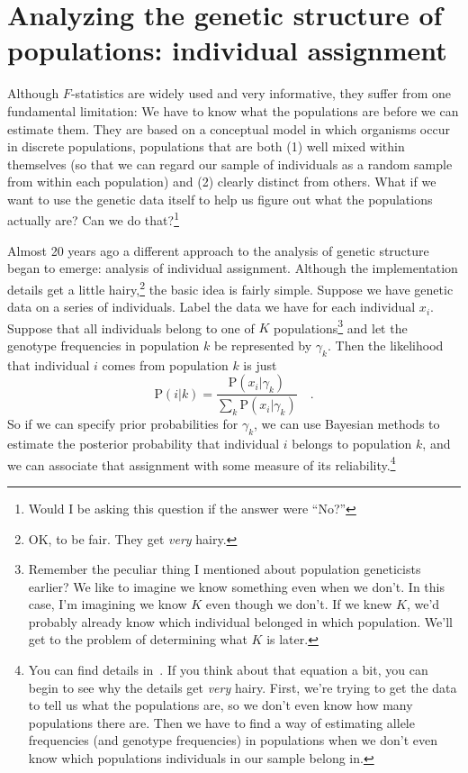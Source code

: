 \chapter{Analyzing the genetic structure of populations: individual assignment}

Although $F$-statistics are widely used and very informative, they
suffer from one fundamental limitation: We have to know what the
populations are before we can estimate them. They are based on a
conceptual model in which organisms occur in discrete populations,
populations that are both (1) well mixed within themselves (so that we
can regard our sample of individuals as a random sample from within
each population) and (2) clearly distinct from others. What if we want
to use the genetic data itself to help us figure out what the
populations actually are? Can we do that?\footnote{Would I be asking
  this question if the answer were ``No?''}

Almost 20 years ago a different approach to the analysis of genetic
structure began to emerge: analysis of individual
assignment. Although the implementation
details get a little hairy,\footnote{OK, to be fair. They get {\it
    very\/} hairy.} the basic idea is fairly simple. Suppose we have
genetic data on a series of individuals. Label the data we have for
each individual $x_i$. Suppose that all individuals belong to one of
$K$ populations\footnote{Remember the peculiar thing I mentioned about
  population geneticists earlier? We like to imagine we know something
  even when we don't. In this case, I'm imagining we know $K$ even
  though we don't. If we knew $K$, we'd probably already know which
  individual belonged in which population. We'll get to the problem of
  determining what $K$ is later.} and let the genotype frequencies in
population $k$ be represented by $\gamma_k$. Then the likelihood that
individual $i$ comes from population $k$ is just
\[
\mbox{P}(i|k) = \frac{\mbox{P}(x_i|\gamma_k)}{\sum_k
  \mbox{P}(x_i|\gamma_k)} \quad .
\]
So if we can specify prior probabilities for $\gamma_k$, we can use
Bayesian methods to estimate the posterior probability that individual
$i$ belongs to population $k$, and we can associate that assignment
with some measure of its reliability.\footnote{You can find details
  in~\cite{Pritchard-etal-2000}. If you think about that equation a
  bit, you can begin to see why the details get {\it very\/}
  hairy. First, we're trying to get the data to tell us what the
  populations are, so we don't even know how many populations there
  are. Then we have to find a way of estimating allele frequencies
  (and genotype frequencies) in populations when we don't even
  know which populations individuals in our sample belong in.}

